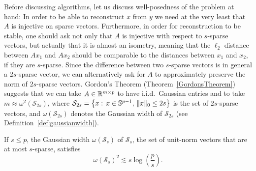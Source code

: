 Before discussing algorithms, let us discuss well-posedness of the problem at hand: In order to be able to reconstruct $x$ from $y$ we need at the very least that $A$ is injective on sparse vectors.
Furthermore, in order for reconstruction to be stable, one should ask not only that $A$ is injective with respect to $s$-sparse vectors, but actually that it is almost an isometry, meaning that the $\ell_2$ distance between $Ax_1$ and $Ax_2$ should be comparable to the distances between $x_1$ and $x_2$, if they are $s$-sparse. Since the difference between two $s$-sparse vectors is in general a $2s$-sparse vector, we can alternatively ask for $A$ to approximately preserve the norm of $2s$-sparse vectors. Gordon's Theorem (Theorem~\ref{GordonsTheorem}) suggests that we can take $A\in\mathbb{R}^{m\times p}$ to have i.i.d.\ Gaussian entries and to take $m\approx \omega^2\left(\mathcal{S}_{2s}\right)$, where $\mathcal{S}_{2s} = \left\{x:\,x\in\mathbb{S}^{p-1},\,\|x\|_0\leq 2s\right\}$ is the set of $2s$-sparse vectors, and $\omega\left(\mathcal{S}_{2s}\right)$ denotes the Gaussian width of $\mathcal{S}_{2s}$ (see Definition~\ref{def:gaussianwidth}).

\begin{proposition}\label{proposition:ssparse:gaussianwidth}
 If $s\leq p$, the Gaussian width $\omega\left(\mathcal{S}_{s}\right)$ of $\mathcal{S}_s$, the set of unit-norm vectors that are at most $s$-sparse, satisfies
 \[
  \omega\left(\mathcal{S}_{s}\right)^2 \lesssim s \log\left( \frac{p}s \right).
 \]
\end{proposition}


